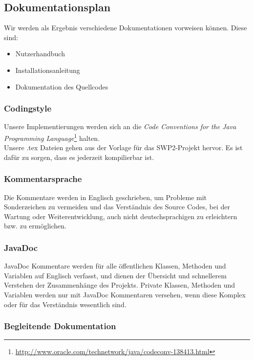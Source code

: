 \documentclass[fontsize=12pt,paper=a4,twoside]{scrartcl}
\begin{document}
\subsection{Dokumentationsplan}
Wir werden als Ergebnis verschiedene Dokumentationen vorweisen können. Diese sind:

\begin{itemize}
\item{Nutzerhandbuch}
\item{Installationsanleitung}
\item{Dokumentation des Quellcodes}
\end{itemize}

\subsubsection{Codingstyle}
Unsere Implementierungen werden sich an die \emph{Code Conventions for the Java Programming Language}\footnote{\url{http://www.oracle.com/technetwork/java/codeconv-138413.html}} halten.\\
Unsere .tex Dateien gehen aus der Vorlage für das SWP2-Projekt hervor. Es ist dafür zu sorgen, dass es jederzeit kompilierbar ist.


\subsubsection{Kommentarsprache}

Die Kommentare werden in Englisch geschrieben, um Probleme mit Sonderzeichen zu vermeiden und das Verständnis des Source Codes, bei der Wartung oder Weiterentwicklung, auch nicht deutschsprachigen zu erleichtern bzw. zu ermöglichen.

\subsubsection{JavaDoc}

JavaDoc Kommentare werden für alle öffentlichen Klassen, Methoden und Variablen auf Englisch verfasst, und dienen der Übersicht und schnellerem Verstehen der Zusammenhänge des Projekts.
Private Klassen, Methoden und Variablen werden nur mit JavaDoc Kommentaren versehen, wenn diese Komplex oder für das Verständnis wesentlich sind.

\subsubsection{Begleitende Dokumentation}
\end{document}
